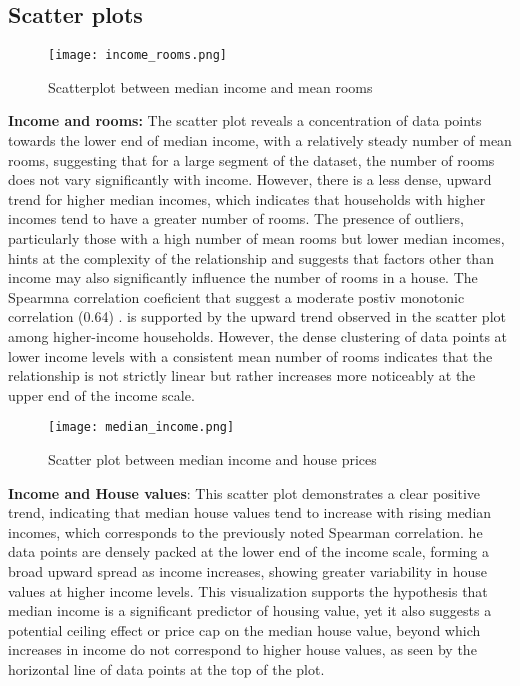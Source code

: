 \documentclass[12pt]{article}
\begin{document}
\subsection{Scatter plots}
\begin{figure}[htbp]
	\centering
	\texttt{[image: income\_rooms.png]}
	\caption{Scatterplot between median income and mean rooms}
	\label{fig:income_rooms}
\end{figure}
\textbf{Income and rooms:} The scatter plot reveals a concentration of data points towards the lower end of median income, with a relatively steady number of mean rooms, suggesting that for a large segment of the dataset, the number of rooms does not vary significantly with income. However, there is a less dense, upward trend for higher median incomes, which indicates that households with higher incomes tend to have a greater number of rooms. The presence of outliers, particularly those with a high number of mean rooms but lower median incomes, hints at the complexity of the relationship and suggests that factors other than income may also significantly influence the number of rooms in a house.
The Spearmna correlation coeficient that suggest a moderate postiv monotonic correlation (0.64) . is supported by the upward trend observed in the scatter plot among higher-income households. However, the dense clustering of data points at lower income levels with a consistent mean number of rooms indicates that the relationship is not strictly linear but rather increases more noticeably at the upper end of the income scale.\\
\begin{figure}[htbp]
	\centering
	\texttt{[image: median\_income.png]}
	\caption{Scatter plot between median income and house prices}
	\label{fig:income_housevalues}
\end{figure}
\textbf{Income and House values}: This scatter plot demonstrates a clear positive trend, indicating that median house values tend to increase with rising median incomes, which corresponds to the previously noted Spearman correlation. he data points are densely packed at the lower end of the income scale, forming a broad upward spread as income increases, showing greater variability in house values at higher income levels. This visualization supports the hypothesis that median income is a significant predictor of housing value, yet it also suggests a potential ceiling effect or price cap on the median house value, beyond which increases in income do not correspond to higher house values, as seen by the horizontal line of data points at the top of the plot.
\end{document}
